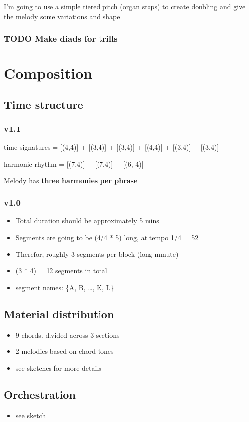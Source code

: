 \documentclass[11pt]{article}
\begin{document}
I'm going to use a simple tiered pitch (organ stops) to create
doubling and give the melody some variations and shape


\subsubsection{{\bfseries\sffamily TODO} Make diads for trills}
\label{sec:org1054fa0}

\section{Composition}
\label{sec:orga43523f}

\subsection{Time structure}
\label{sec:org37047e6}
\subsubsection{v1.1}
\label{sec:orga98a7c6}

time signatures = [(4,4)] + [(3,4)] + [(3,4)] + [(4,4)] + [(3,4)] + [(3,4)] 

harmonic rhythm = [(7,4)] + [(7,4)] + [(6, 4)]

Melody has \textbf{three harmonies per phrase}

\subsubsection{v1.0}
\label{sec:orgfcf0549}
\begin{itemize}
\item Total duration should be approximately 5 mins
\item Segments are going to be (4/4 * 5) long, at tempo 1/4 = 52
\item Therefor, roughly 3 segments per block (long minute)
\item (3 * 4) = 12 segments in total
\item segment names: \{A, B, \ldots{}, K, L\}
\end{itemize}

\subsection{Material distribution}
\label{sec:orgd06486c}
\begin{itemize}
\item 9 chords, divided across 3 sections
\item 2 melodies based on chord tones
\item see sketches for more details
\end{itemize}

\subsection{Orchestration}
\label{sec:orgc911eca}
\begin{itemize}
\item see sketch
\end{itemize}
\end{document}
